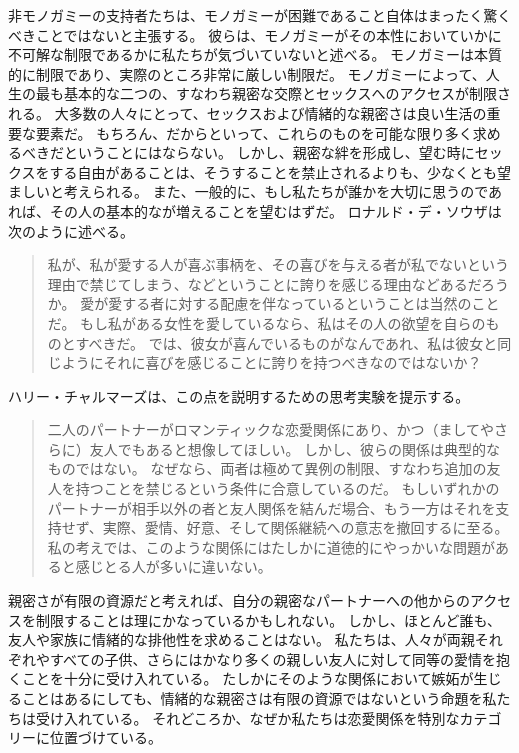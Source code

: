 \documentclass[paper=a4,book,openany]{jlreq} \usepackage{mystyle}
\begin{document}
非モノガミーの支持者たちは、モノガミーが困難であること自体はまったく驚くべきことではないと主張する。
彼らは、モノガミーがその本性においていかに不可解な制限であるかに私たちが気づいていないと述べる。
モノガミーは本質的に制限であり、実際のところ非常に厳しい制限だ。
モノガミーによって、人生の最も基本的な二つの、すなわち親密な交際とセックスへのアクセスが制限される。
大多数の人々にとって、セックスおよび情緒的な親密さは良い生活の重要な要素だ。
もちろん、だからといって、これらのものを可能な限り多く求めるべきだということにはならない。
しかし、親密な絆を形成し、望む時にセックスをする自由があることは、そうすることを禁止されるよりも、少なくとも望ましいと考えられる。
また、一般的に、もし私たちが誰かを大切に思うのであれば、その人の基本的なが増えることを望むはずだ。
ロナルド・デ・ソウザは次のように述べる。

\begin{quote}

私が、私が愛する人が喜ぶ事柄を、その喜びを与える者が私でないという理由で禁じてしまう、などということに誇りを感じる理由などあるだろうか。
愛が愛する者に対する配慮を伴なっているということは当然のことだ。
もし私がある女性を愛しているなら、私はその人の欲望を自らのものとすべきだ。
では、彼女が喜んでいるものがなんであれ、私は彼女と同じようにそれに喜びを感じることに誇りを持つべきなのではないか？ \citep{sousa18:_how_think_yours_out_jealous}
\end{quote}

ハリー・チャルマーズは、この点を説明するための思考実験を提示する。

\begin{quote}

二人のパートナーがロマンティックな恋愛関係にあり、かつ（ましてやさらに）友人でもあると想像してほしい。
しかし、彼らの関係は典型的なものではない。
なぜなら、両者は極めて異例の制限、すなわち追加の友人を持つことを禁じるという条件に合意しているのだ。
もしいずれかのパートナーが相手以外の者と友人関係を結んだ場合、もう一方はそれを支持せず、実際、愛情、好意、そして関係継続への意志を撤回するに至る。
私の考えでは、このような関係にはたしかに道徳的にやっかいな問題があると感じとる人が多いに違いない。
\citep[p.225]{chalmers19:_is_monog_moral_permis}
\end{quote}

親密さが有限の資源だと考えれば、自分の親密なパートナーへの他からのアクセスを制限することは理にかなっているかもしれない。
しかし、ほとんど誰も、友人や家族に情緒的な排他性を求めることはない。
私たちは、人々が両親それぞれやすべての子供、さらにはかなり多くの親しい友人に対して同等の愛情を抱くことを十分に受け入れている。
たしかにそのような関係において嫉妬が生じることはあるにしても、情緒的な親密さは有限の資源ではないという命題を私たちは受け入れている。
それどころか、なぜか私たちは恋愛関係を特別なカテゴリーに位置づけている。
\end{document}
